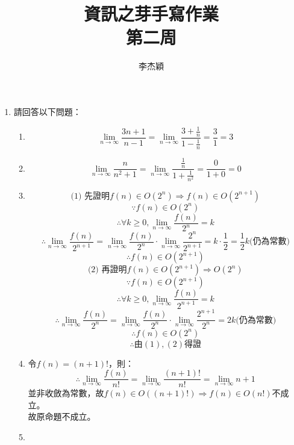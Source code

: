 \documentclass[12pt,a4paper]{article}
\title{資訊之芽手寫作業\\第二周}
\author{李杰穎}
\date{}
\begin{document}
\maketitle
\begin{enumerate}
\item 請回答以下問題：
    \begin{enumerate}
        \item $$\lim_{n\to\infty}\frac{3n+1}{n-1} = \lim_{n\to\infty}\frac{3+\frac{1}{n}}{1-\frac{1}{n}} = \frac{3}{1} = 3 $$
        \item $$\lim_{n\to\infty}\frac{n}{n^2+1}=\lim_{n\to\infty}\frac{\frac{1}{n}}{1+\frac{1}{n^2}}=\frac{0}{1+0}=0$$
        \item%
            $$\textrm{(1) 先證明}f(n)\in O(2^n)\Rightarrow f(n)\in O(2^{n+1})$$    
            $$\because f(n) \in O(2^n)$$
            $$\therefore \forall k \geq 0, \lim_{n\to\infty}\frac{f(n)}{2^n}=k$$
            $$\therefore \lim_{n\to\infty}\frac{f(n)}{2^{n+1}}=\lim_{n\to\infty}\frac{f(n)}{2^n}\cdot\lim_{n\to\infty}\frac{2^n}{2^{n+1}}=k\cdot \frac{1}{2}=\frac{1}{2}k \textrm{(仍為常數)}$$
            \begin{equation}
                \therefore f(n) \in O(2^{n+1})
            \end{equation}
            $$\textrm{(2) 再證明}f(n)\in O(2^{n+1})\Rightarrow O(2^n)$$
            $$\because f(n) \in O(2^{n+1})$$
            $$\therefore \forall k \geq 0, \lim_{n\to\infty}\frac{f(n)}{2^{n+1}}=k$$
            $$\therefore \lim_{n\to\infty}\frac{f(n)}{2^n}=\lim_{n\to\infty}\frac{f(n)}{2^n}\cdot\lim_{n\to\infty}\frac{2^{n+1}}{2^n}=2k\textrm{(仍為常數)}$$
            \begin{equation}
                \therefore f(n) \in O(2^{n})
            \end{equation}
            $$\therefore \textrm{由}(1), (2)\textrm{得證}$$
        \item%
            令$f(n)=(n+1)!$，則：
            $$\therefore \lim_{n\to\infty}\frac{f(n)}{n!}=\lim_{n\to\infty}\frac{(n+1)!}{n!}=\lim_{n\to\infty}n+1$$
            並非收斂為常數，故$f(n)\in O((n+1)!)\Rightarrow f(n) \in O(n!)$不成立。\\
            故原命題不成立。
        \item
    \end{enumerate}
    
\end{enumerate}
\end{document}
